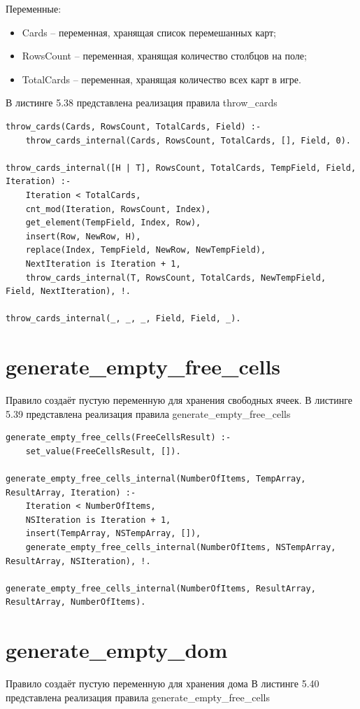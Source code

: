 \documentclass[12pt]{report}
\begin{document}
Переменные:
\begin{itemize}
\item Cards – переменная, хранящая список перемешанных карт;
\item RowsCount – переменная, хранящая количество столбцов на поле;
\item TotalCards – переменная, хранящая количество всех карт в игре.
\end{itemize}

В листинге 5.38 представлена реализация правила throw\_cards

\begin{lstlisting}[label=some-code, caption=реализация правила throw\_cards]
throw_cards(Cards, RowsCount, TotalCards, Field) :-
	throw_cards_internal(Cards, RowsCount, TotalCards, [], Field, 0).

throw_cards_internal([H | T], RowsCount, TotalCards, TempField, Field, Iteration) :-
	Iteration < TotalCards,
	cnt_mod(Iteration, RowsCount, Index),
	get_element(TempField, Index, Row),
	insert(Row, NewRow, H),
	replace(Index, TempField, NewRow, NewTempField),
	NextIteration is Iteration + 1,
	throw_cards_internal(T, RowsCount, TotalCards, NewTempField, Field, NextIteration), !.

throw_cards_internal(_, _, _, Field, Field, _).
\end{lstlisting}
\section{generate\_empty\_free\_cells}
Правило создаёт пустую переменную для хранения свободных ячеек.
В листинге 5.39 представлена реализация правила generate\_empty\_free\_cells

\begin{lstlisting}[label=some-code, caption=реализация правила generate\_empty\_free\_cells]
generate_empty_free_cells(FreeCellsResult) :-
	set_value(FreeCellsResult, []).

generate_empty_free_cells_internal(NumberOfItems, TempArray, ResultArray, Iteration) :-
	Iteration < NumberOfItems,
	NSIteration is Iteration + 1,
	insert(TempArray, NSTempArray, []),
	generate_empty_free_cells_internal(NumberOfItems, NSTempArray, ResultArray, NSIteration), !.

generate_empty_free_cells_internal(NumberOfItems, ResultArray, ResultArray, NumberOfItems).

\end{lstlisting}
\section{generate\_empty\_dom}
Правило создаёт пустую переменную для хранения дома
В листинге 5.40 представлена реализация правила generate\_empty\_free\_cells
\end{document}
